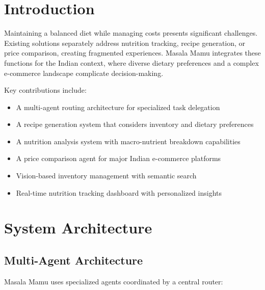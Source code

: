 \documentclass{ecai}
\begin{document}
\section{Introduction}

Maintaining a balanced diet while managing costs presents significant challenges. Existing solutions separately address nutrition tracking, recipe generation, or price comparison, creating fragmented experiences. Masala Mamu integrates these functions for the Indian context, where diverse dietary preferences and a complex e-commerce landscape complicate decision-making.

Key contributions include:
\begin{itemize}[noitemsep,topsep=0pt]
    \item A multi-agent routing architecture for specialized task delegation
    \item A recipe generation system that considers inventory and dietary preferences
    \item A nutrition analysis system with macro-nutrient breakdown capabilities
    \item A price comparison agent for major Indian e-commerce platforms
    \item Vision-based inventory management with semantic search
    \item Real-time nutrition tracking dashboard with personalized insights
\end{itemize}

\section{System Architecture}

\subsection{Multi-Agent Architecture}

Masala Mamu uses specialized agents coordinated by a central router:
\end{document}
